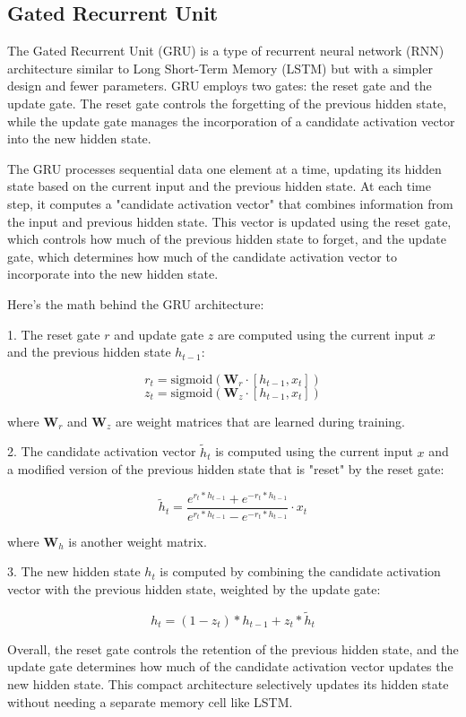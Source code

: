 \documentclass{ieeeojies}
\begin{document}
 \subsection{Gated Recurrent Unit}
 The Gated Recurrent Unit (GRU) is a type of recurrent neural network (RNN) architecture similar to Long Short-Term Memory (LSTM) but with a simpler design and fewer parameters. GRU employs two gates: the reset gate and the update gate. The reset gate controls the forgetting of the previous hidden state, while the update gate manages the incorporation of a candidate activation vector into the new hidden state.

 The GRU processes sequential data one element at a time, updating its hidden state based on the current input and the previous hidden state. At each time step, it computes a "candidate activation vector" that combines information from the input and previous hidden state. This vector is updated using the reset gate, which controls how much of the previous hidden state to forget, and the update gate, which determines how much of the candidate activation vector to incorporate into the new hidden state.

 Here’s the math behind the GRU architecture:

 1. The reset gate \( r \) and update gate \( z \) are computed using the current input \( x \) and the previous hidden state \( h_{t-1} \):

 \[
  r_t = \text{sigmoid}(\mathbf{W}_r \cdot [h_{t-1}, x_t])
  \]
  \[
  z_t = \text{sigmoid}(\mathbf{W}_z \cdot [h_{t-1}, x_t])
  \]

where \( \mathbf{W}_r \) and \( \mathbf{W}_z \) are weight matrices that are learned during training.

 2. The candidate activation vector \( \tilde{h}_t \) is computed using the current input \( x \) and a modified version of the previous hidden state that is "reset" by the reset gate:

\[ \tilde{h}_t = \frac{{e^{r_t \ast h_{t-1}} + e^{-r_t \ast h_{t-1}}}}{{e^{r_t \ast h_{t-1}} - e^{-r_t \ast h_{t-1}}}} \cdot x_t \]

where \( \mathbf{W}_h \) is another weight matrix.

 3. The new hidden state \( h_t \) is computed by combining the candidate activation vector with the previous hidden state, weighted by the update gate:

\[ h_t = (1 - z_t) \ast h_{t-1} + z_t \ast \tilde{h}_t \]

 Overall, the reset gate controls the retention of the previous hidden state, and the update gate determines how much of the candidate activation vector updates the new hidden state. This compact architecture selectively updates its hidden state without needing a separate memory cell like LSTM.
\end{document}
